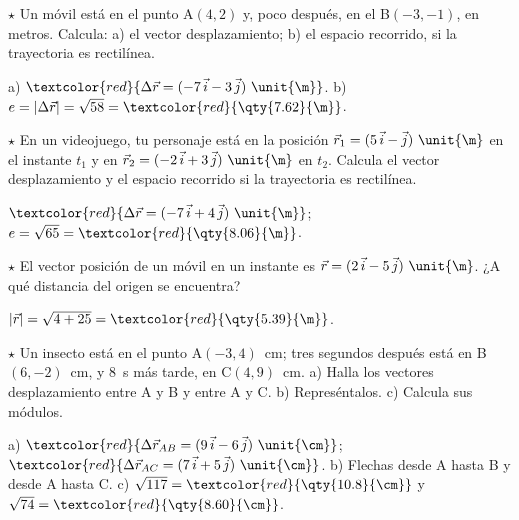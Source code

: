 \begin{exercise}
    \(\star\) Un móvil está en el punto A\((4, 2)\) y, poco después, en el B\((-3, -1)\), en metros. Calcula: a) el vector
    desplazamiento; b) el espacio recorrido, si la trayectoria es rectilínea.
    \begin{solu}
        a) \(\textcolor{red}{\Delta\vec r = (-7\,\ivec - 3\,\jvec)~\unit{\m}}\). b) \(e = |\Delta\vec r| = \sqrt{58} = \textcolor{red}{\qty{7.62}{\m}}\).
    \end{solu}
\end{exercise}

\begin{exercise}
    \(\star\) En un videojuego, tu personaje está en la posición \(\vec r_1 = (5\,\ivec - \jvec)~\unit{\m}\) en el instante \(t_1\) y
    en \(\vec r_2 = (-2\,\ivec + 3\,\jvec)~\unit{\m}\) en \(t_2\). Calcula el vector desplazamiento y el espacio recorrido si la
    trayectoria es rectilínea.
    \begin{solu}
        \(\textcolor{red}{\Delta\vec r = (-7\,\ivec + 4\,\jvec)~\unit{\m}}\); \(e = \sqrt{65} = \textcolor{red}{\qty{8.06}{\m}}\).
    \end{solu}
\end{exercise}

\begin{exercise}
    \(\star\) El vector posición de un móvil en un instante es \(\vec r = (2\,\ivec - 5\,\jvec)~\unit{\m}\). ¿A qué distancia del
    origen se encuentra?
    \begin{solu}
        \(|\vec r| = \sqrt{4 + 25} = \textcolor{red}{\qty{5.39}{\m}}\).
    \end{solu}
\end{exercise}

\begin{exercise}
    \(\star\) Un insecto está en el punto A\((-3, 4)\)~\unit{\cm}; tres segundos después está en B\((6, -2)\)~\unit{\cm}, y
    \qty{8}{\s} más tarde, en C\((4, 9)\)~\unit{\cm}. a) Halla los vectores desplazamiento entre A y B y entre A y C. b) Represéntalos.
    c) Calcula sus módulos.
    \begin{solu}
        a) \(\textcolor{red}{\Delta\vec r_{AB} = (9\,\ivec - 6\,\jvec)~\unit{\cm}}\); \(\textcolor{red}{\Delta\vec r_{AC} = (7\,\ivec + 5\,\jvec)~\unit{\cm}}\).
        b) Flechas desde A hasta B y desde A hasta C. c) \(\sqrt{117} = \textcolor{red}{\qty{10.8}{\cm}}\) y
        \(\sqrt{74} = \textcolor{red}{\qty{8.60}{\cm}}\).
    \end{solu}
\end{exercise}

